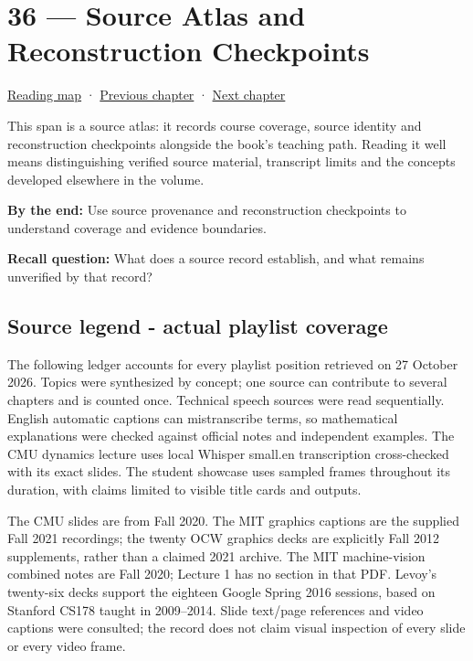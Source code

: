 \hypertarget{04-visual-computing-ii-ch036}{}
\section{36 --- Source Atlas and Reconstruction Checkpoints}\label{source-atlas-and-reconstruction-checkpoints}

\href{Chapter\%20Edition/02\%20-\%20Graphics\%20Vision\%20and\%20XR/00\%20-\%20Reading\%20Map}{Reading map} · \hyperref[04-visual-computing-ii-ch035]{Previous chapter} · \hyperref[04-visual-computing-ii-ch037]{Next chapter}

This span is a source atlas: it records course coverage, source identity and reconstruction checkpoints alongside the book's teaching path. Reading it well means distinguishing verified source material, transcript limits and the concepts developed elsewhere in the volume.

\textbf{By the end:} Use source provenance and reconstruction checkpoints to understand coverage and evidence boundaries.

\textbf{Recall question:} What does a source record establish, and what remains unverified by that record?

\subsection{Source legend - actual playlist coverage}\label{source-legend---actual-playlist-coverage}

The following ledger accounts for every playlist position retrieved on 27 October 2026. Topics were synthesized by concept; one source can contribute to several chapters and is counted once. Technical speech sources were read sequentially. English automatic captions can mistranscribe terms, so mathematical explanations were checked against official notes and independent examples. The CMU dynamics lecture uses local Whisper small.en transcription cross-checked with its exact slides. The student showcase uses sampled frames throughout its duration, with claims limited to visible title cards and outputs.

The CMU slides are from Fall 2020. The MIT graphics captions are the supplied Fall 2021 recordings; the twenty OCW graphics decks are explicitly Fall 2012 supplements, rather than a claimed 2021 archive. The MIT machine-vision combined notes are Fall 2020; Lecture 1 has no section in that PDF. Levoy's twenty-six decks support the eighteen Google Spring 2016 sessions, based on Stanford CS178 taught in 2009--2014. Slide text/page references and video captions were consulted; the record does not claim visual inspection of every slide or every video frame.

